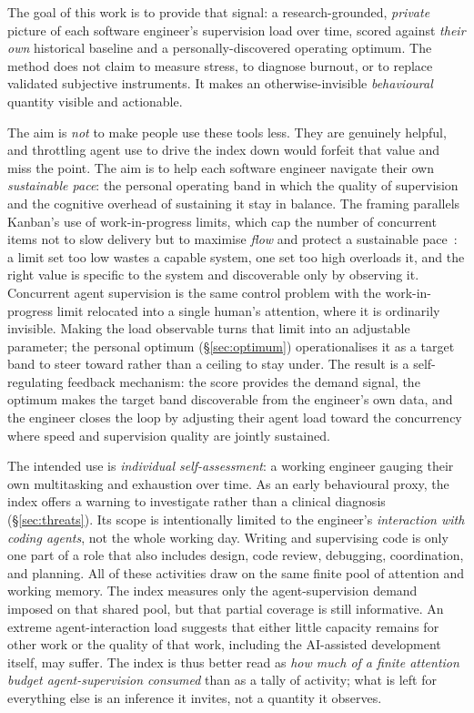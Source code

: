 \documentclass[10pt,twocolumn]{article}
\begin{document}
The goal of this work is to provide that signal: a research-grounded,
\emph{private} picture of each software engineer's supervision load over time,
scored against \emph{their own} historical baseline and a personally-discovered
operating optimum. The method does not claim to measure stress, to diagnose
burnout, or to replace validated subjective instruments. It makes an
otherwise-invisible \emph{behavioural} quantity visible and actionable.

The aim is \emph{not} to make people use these tools less. They are
genuinely helpful, and throttling agent use to drive the index down would
forfeit that value and miss the point. The aim is to help each software engineer
navigate their own \emph{sustainable pace}: the personal operating band in which
the quality of supervision and the cognitive overhead of sustaining it stay in
balance. The framing parallels Kanban's use of work-in-progress limits,
which cap the number of concurrent items not to slow delivery but to maximise
\emph{flow} and protect a sustainable pace~\cite{anderson2010,beck2000}: a
limit set too low wastes a capable system, one set too high overloads it, and
the right value is specific to the system and discoverable only by observing
it. Concurrent agent supervision is the same control problem with the
work-in-progress limit relocated into a single human's attention, where it is
ordinarily invisible. Making the load observable turns that limit into an
adjustable parameter; the personal optimum (\S\ref{sec:optimum}) operationalises
it as a target band to steer toward rather than a ceiling to stay under. The
result is a self-regulating feedback mechanism: the score provides the demand
signal, the optimum makes the target band discoverable from the engineer's own
data, and the engineer closes the loop by adjusting their agent load toward the
concurrency where speed and supervision quality are jointly sustained.

The intended use is \emph{individual self-assessment}: a working engineer gauging
their own multitasking and exhaustion over time. As an early behavioural proxy,
the index offers a warning to investigate rather than a clinical diagnosis
(\S\ref{sec:threats}). Its scope is intentionally limited to the engineer's
\emph{interaction with coding agents}, not the whole working day. Writing and
supervising code is only one part of a role that also includes design, code
review, debugging, coordination, and planning. All of these activities draw on
the same finite pool of attention and working memory. The index measures only
the agent-supervision demand imposed on that shared pool, but that partial
coverage is still informative. An extreme agent-interaction load suggests that
either little capacity remains for other work or the quality of that work,
including the AI-assisted development itself, may suffer. The index is thus better read
as \emph{how much of a finite attention budget agent-supervision consumed} than
as a tally of activity; what is left for everything else is an inference it
invites, not a quantity it observes.
\end{document}
